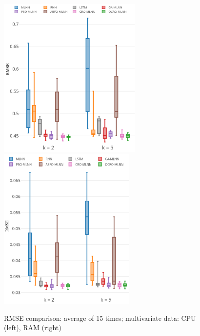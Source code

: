 \documentclass[11pt,twoside]{article}
\begin{document}
\begin{multicols}{2}
\begin{figure}
	\centering
	\begin{minipage}[h]{1\textwidth}
		\centering
		\includegraphics[width=0.45\textwidth =0cm 0cm 0cm 0cm, height = 8cm]{stability/st_cpu_2.pdf}
		\centering
		\includegraphics[width=0.45\textwidth =0cm 0cm 0cm 0cm, height = 8.1cm]{stability/st_ram_2.pdf}
	\end{minipage}
	\caption{RMSE comparison: average of 15 times; multivariate data: CPU (left), RAM (right)} 
	\label{fig:stability_multi}
\end{figure}


\end{multicols}
\end{document}
